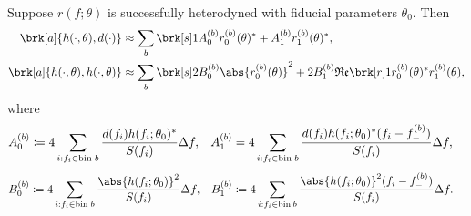 %
\begin{proposition}[]\label{}
Suppose $r(f;\theta)$ is successfully heterodyned with fiducial parameters $\theta_0$. Then
\begin{align*}
\brk[a]{h(\cdot, \theta), d(\cdot)} &\approx \sum_b \brk[s]1{A_0^{(b)} r_0^{(b)}(\theta)^* + A_1^{(b)} r_1^{(b)}(\theta)^*}, \\
\brk[a]{h(\cdot,\theta), h(\cdot,\theta)} &\approx \sum_b \brk[s]2{B_0^{(b)} \abs{r_0^{(b)}(\theta)}^2 + 2 B_1^{(b)} \re \brk[r]1{r_0^{(b)}(\theta)^* r_1^{(b)}(\theta)}},
\end{align*}
where
\begin{align*}
A_0^{(b)} &\coloneqq 4 \sum_{i: f_i \in \text{bin} \; b} \frac{d(f_i) h(f_i;\theta_0)^*}{S(f_i)} \Delta f, & A_1^{(b)} &= 4 \sum_{i:f_i \in \text{bin} \; b} \frac{d(f_i) h(f_i;\theta_0)^*(f_i - f_-^{(b)})}{S(f_i)} \Delta f,
\end{align*}
%
\begin{align*}
B_0^{(b)} &\defn 4 \sum_{i:f_i \in \text{bin} \; b} \frac{\abs{h(f_i;\theta_0)}^2}{S(f_i)}\Delta f, & B_1^{(b)} &\defn 4 \sum_{i:f_i \in \text{bin} \: b} \frac{\abs{h(f_i;\theta_0)}^2(f_i-f_-^{(b)})}{S(f_i)}\Delta f.
\end{align*}
\end{proposition}
